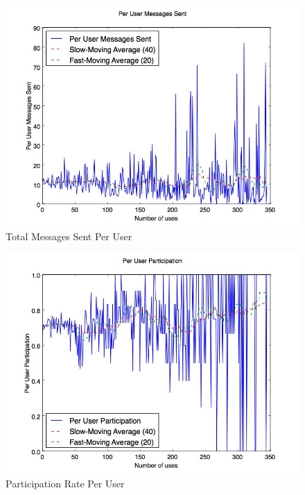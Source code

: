 \begin{figure}[H]
\centering
\includegraphics[trim= 0mm 0mm 0mm 0mm, clip, scale=0.5]{./Figures/PerUserMessagesSent.jpg}
\caption{Total Messages Sent Per User}
\label{fig:PerUserMessagesSent}
\end{figure}

\begin{figure}[H]
\centering
\includegraphics[trim= 0mm 0mm 0mm 0mm, clip, scale=0.5]{./Figures/PerUserParticipation.jpg}
\caption{Participation Rate Per User}
\label{fig:PerUserParticipation}
\end{figure}

